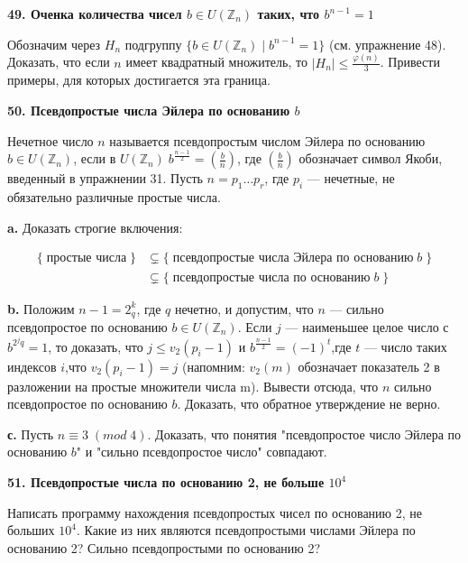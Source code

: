 \documentclass{mai_book}
\begin{document}
\bigskip
\noindent\textbf{49. Оченка количества чисел $b\in U(\mathbb {Z}_n)$ таких, что $b^{n-1}=1$}

\medskip
Обозначим через $H_n$ подгруппу $\{b\in U(\mathbb {Z}_n)\;|\;b^{n-1}=1\}$ (см. упраж­нение 48).
Доказать, что если $n$ имеет квадратный множитель, то $|H_n|\le \frac{\varphi (n)}3$.
Привести примеры, для которых достигается эта граница.

\newpage


\noindent\textbf{50. Псевдопростые числа Эйлера по основанию $b$}

\medskip
Нечетное число $n$ называется псевдопростым числом Эйлера по основанию $b\in U(\mathbb {Z}_n)$, если в $U(\mathbb {Z}_n)\;b^{\frac{n-1}2}=(\frac{b}n)$, где $(\frac{b}n)$ обозначает сим­вол Якоби, введенный в упражнении 31.
Пусть $n=p_1 \dots p_r$, где $p_i$ --- нечетные, не обязательно различные простые числа.

\textbf{a.} Доказать строгие включения:

$$
\begin{aligned}
\{\;\text{простые числа}\;\} &\subsetneq \{\;\text{псевдопростые числа Эйлера по основанию}\;b\;\} \\
                                        &\subsetneq \{\;\text{псевдопростые числа по основанию}\;b\;\}
\end{aligned}
$$

\medskip
\textbf{b.} Положим $n-1=2^k_q$, где $q$ нечетно, и допустим, что $n$ --- сильно псевдопростое по основанию $b\in U(\mathbb {Z}_n)$. 
Если $j$ --- наименьшее целое число с $b^{2^jq}=1$, то доказать, что $j\leq v_2(p_i-1)$ и $b^\frac{n-1}2=(-1)^t$,где $t$ --- число таких индексов $i$,что $v_2(p_i-1)=j$ (напомним: $v_2(m)$ обозначает показатель 2 в разложении на простые множители числа m). 
Вывести отсюда, что $n$ сильно псевдопростое по основанию $b$. 
Доказать, что обратное утверждение не верно.

\textbf{с.} Пусть $n\equiv3\;(mod\;4)$. 
Доказать, что понятия "псевдопростое число Эйлера по основанию $b$" и "сильно псевдопростое число" совпадают.

\bigskip
\noindent\textbf{51. Псевдопростые числа по основанию 2, не больше $10^4$}

\medskip
Написать программу нахождения псевдопростых чисел по основанию 2, не больших $10^4$.
Какие из них являются псевдопростыми числами Эйлера по основанию 2? Сильно псевдопростыми по основанию 2?
\end{document}
